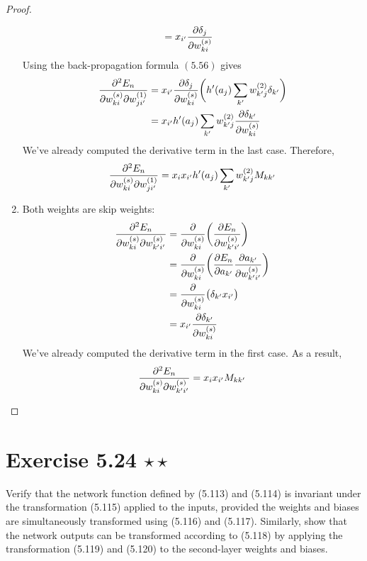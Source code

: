 \begin{proof}
\begin{enumerate}
\begin{align*}
                &= x_{i'} \pdv{\delta_j}{w_{ki}^{(s)}} 
            \end{align*}
            Using the back-propagation formula $(5.56)$ gives
            \begin{align*}
                \pdv{E_n}{w_{ki}^{(s)}}{w_{ji'}^{(1)}}
                &= x_{i'} \pdv{\delta_j}{w_{ki}^{(s)}}\bigg(h'(a_j) \sum_{k'} w_{k'j}^{(2)} \delta_{k'}\bigg)  \\
                &= x_{i'} h'(a_j) \sum_{k'} w_{k'j}^{(2)} \pdv{\delta_{k'}}{w_{ki}^{(s)}} 
            \end{align*}
            We've already computed the derivative term in the last case. Therefore,
            \[
                \pdv{E_n}{w_{ki}^{(s)}}{w_{ji'}^{(1)}}
                = x_i x_{i'} h'(a_j) \sum_{k'} w_{k' j}^{(2)} M_{kk'}
            \] 
        \item Both weights are skip weights:
            \begin{align*}
                \pdv{E_n}{w_{ki}^{(s)}}{w_{k'i'}^{(s)}}
                &= \pdv{w_{ki}^{(s)}} \bigg(\pdv{E_n}{w_{k'i'}^{(s)}}\bigg) \\
                &= \pdv{w_{ki}^{(s)}} \bigg(\pdv{E_n}{a_{k'}} \pdv{a_{k'}}{w_{k'i'}^{(s)}}\bigg) \\
                &= \pdv{w_{ki}^{(s)}} \big(\delta_{k'} x_{i'}\big) \\
                &= x_{i'} \pdv{\delta_{k'}}{w_{ki}^{(s)}} 
            \end{align*}
            We've already computed the derivative term in the first case. As a result,
            \[
                \pdv{E_n}{w_{ki}^{(s)}}{w_{k'i'}^{(s)}}
                = x_{i} x_{i'} M_{kk'}
            \] 
    \end{enumerate}
\end{proof}

\section*{Exercise 5.24 $\star \star$}
Verify that the network function defined by (5.113) and (5.114) is invariant
under the transformation (5.115) applied to the inputs,
provided the weights and biases are simultaneously transformed using
(5.116) and (5.117). Similarly, show that the network outputs can be
transformed according to (5.118) by applying the transformation (5.119)
and (5.120) to the second-layer weights and biases.

\vspace{1em}

